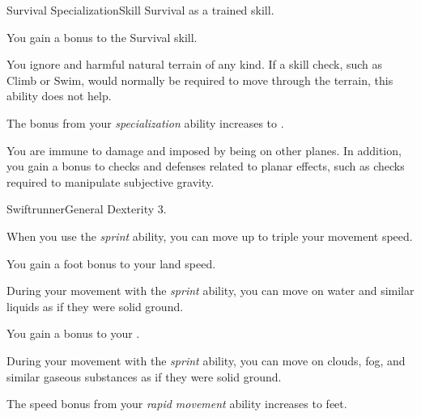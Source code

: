     \begin{feat}{Survival Specialization}{Skill}
        \featpre Survival as a trained skill.

         You gain a  bonus to the Survival skill.

         You ignore  and harmful natural terrain of any kind.
        If a skill check, such as Climb or Swim, would normally be required to move through the terrain, this ability does not help.

         The bonus from your \textit{specialization} ability increases to .

         You are immune to damage and  imposed by being on other planes.
        In addition, you gain a  bonus to checks and defenses related to planar effects, such as checks required to manipulate subjective gravity.
    \end{feat}

    \begin{feat}{Swiftrunner}{General}
        \featpre Dexterity 3.

         When you use the \textit{sprint} ability, you can move up to triple your movement speed.

         You gain a  foot bonus to your land speed.

         During your movement with the \textit{sprint} ability, you can move on water and similar liquids as if they were solid ground.

         You gain a  bonus to your .

         During your movement with the \textit{sprint} ability, you can move on clouds, fog, and similar gaseous substances as if they were solid ground.

         The speed bonus from your \textit{rapid movement} ability increases to  feet.
    \end{feat}

